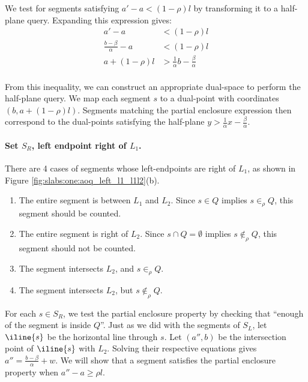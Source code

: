We test for segments satisfying $a' - a < (1 - \rho)l$ by transforming it to a half-plane query. Expanding this expression gives:
\[
\begin{split}
a' - a &< (1 - \rho)l \\
%
\frac{b - \beta}{\alpha} - a &< (1 - \rho)l \\
%
a + (1 - \rho)l &> \frac{1}{\alpha} b - \frac{\beta}{\alpha}  \\
\end{split}
\]

From this inequality, we can construct an appropriate dual-space to perform the half-plane query. We map each segment $s$ to a dual-point with coordinates $(b, a + (1-\rho)l)$. 
Segments matching the partial enclosure expression then correspond to the dual-points satisfying the half-plane $y > \frac{1}{\alpha}x - \frac{\beta}{\alpha}$.


\paragraph{Set $S_R$, left endpoint right of $L_1$.}
There are 4 cases of segments whose left-endpoints are right of $L_1$, as shown in Figure \ref{fig:slabs:one:aoq_left_l1_l1l2}(b).



\begin{enumerate}
 \item The entire segment is between $L_1$ and $L_2$. Since $s \in Q$ implies $s \in_\rho Q$, this segment should be counted.

 \item The entire segment is right of $L_2$. Since $s \cap Q = \emptyset$ implies $s \not \in_\rho Q$, this segment should not be counted.

 \item The segment intersects $L_2$, and $s \in_\rho Q$.

 \item The segment intersects $L_2$, but $s \not \in_\rho Q$.

\end{enumerate}

For each $s \in S_R$, we test the partial enclosure property by checking that ``enough of the segment is inside $Q$''.
Just as we did with the segments of $S_L$, let $\iline{s}$ be the horizontal line through $s$.
Let $(a'', b)$ be the intersection point of $\iline{s}$ with $L_2$.
Solving their respective equations gives $a'' = \frac{b - \beta}{\alpha} + w$.  
We will show that a segment satisfies the partial enclosure property when $a'' - a \geq \rho l$.

